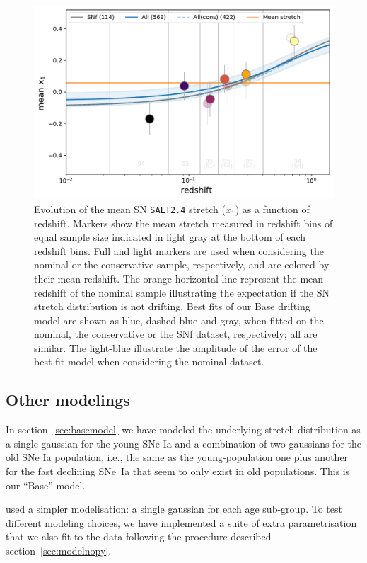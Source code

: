 \documentclass[]{aa} %
\newcommand{\nn}[1]{{\textcolor[rgb]{1, 0.27, 0}{#1}}}
\begin{document}
\begin{figure}
    \centering
    \includegraphics[width=0.7\linewidth]{Article_figures/stretchevol_all_vs_snf.pdf}
    \caption{Evolution of the mean SN \textsc{\texttt{SALT2.4}} stretch ($x_1$)
        as a function of redshift.  Markers show the mean stretch measured in
        redshift bins of equal sample size indicated in light gray at the bottom
        of each redshift bins. Full and light markers are used when considering
        the nominal or the conservative sample, respectively, and are colored by
        their mean redshift.  The orange horizontal line represent the mean
        redshift of the nominal sample illustrating the expectation if the SN
        stretch distribution is not drifting. Best fits of our Base drifting
        model are shown as blue, dashed-blue and gray, when fitted on the
    nominal, the conservative or the SNf dataset, respectively; all are similar.
The light-blue illustrate the amplitude of the error of the best fit model when
considering the nominal dataset.}
    \label{fig:modelall}
\end{figure}

\subsection{Other modelings}
\label{sec:othermodel}

In section~\nn{\ref{sec:basemodel}} we have modeled the underlying stretch
distribution as a single gaussian for the young SNe Ia and a combination of two
gaussians for the old SNe Ia population, i.e., the same as the young-population
one plus another for the fast declining SNe~Ia that seem to only exist in old
populations. This is our “Base” model.

\cite{howell2007} used a simpler modelisation: a single gaussian for each age
sub-group. To test \nn{different modeling choices}, we have implemented a suite
of extra parametrisation that we also fit to the data following the procedure
described section~\ref{sec:modelnopy}. 
\end{document}
